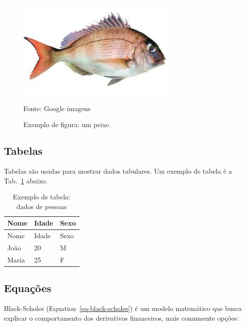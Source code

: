 \documentclass[
  12pt,
  oneside,
  a4paper,
  english,
  brazil]{abntex2}
\begin{document}
\begin{figure}

\caption{\label{fig-peixe}Exemplo de figura: um peixe.}

\begin{minipage}{\linewidth}
\includegraphics[width=3.125in,height=\textheight,keepaspectratio]{figuras/images.jpg}\end{minipage}%
\newline
\begin{minipage}{\linewidth}
Fonte: Google imagens\end{minipage}%

\end{figure}%

\subsection{Tabelas}\label{tabelas}

Tabelas são usadas para mostrar dados tabulares. Um exemplo de tabela é
a Tab.~\ref{tbl-1} abaixo.

\begin{longtable}[]{@{}lll@{}}
\caption{Exemplo de tabela: dados de
pessoas}\label{tbl-1}\tabularnewline
\toprule\noalign{}
Nome & Idade & Sexo \\
\midrule\noalign{}
\endfirsthead
\toprule\noalign{}
Nome & Idade & Sexo \\
\midrule\noalign{}
\endhead
\bottomrule\noalign{}
\endlastfoot
João & 20 & M \\
Maria & 25 & F \\
\end{longtable}

\subsection{Equações}\label{equauxe7uxf5es}

Black-Scholes (Equation~\ref{eq-black-scholes}) é um modelo matemático
que busca explicar o comportamento dos derivativos financeiros, mais
comumente opções:
\end{document}
